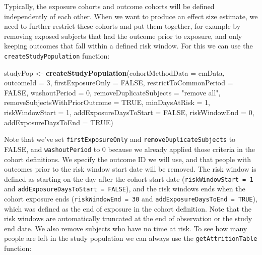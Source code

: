 \documentclass[11pt]{book}
\newenvironment{Shaded}{\begin{snugshade}}{\end{snugshade}}
\newcommand{\KeywordTok}[1]{\textcolor[rgb]{0.13,0.29,0.53}{\textbf{#1}}}
\newcommand{\DataTypeTok}[1]{\textcolor[rgb]{0.13,0.29,0.53}{#1}}
\newcommand{\DecValTok}[1]{\textcolor[rgb]{0.00,0.00,0.81}{#1}}
\newcommand{\StringTok}[1]{\textcolor[rgb]{0.31,0.60,0.02}{#1}}
\newcommand{\OtherTok}[1]{\textcolor[rgb]{0.56,0.35,0.01}{#1}}
\newcommand{\NormalTok}[1]{#1}
\begin{document}
Typically, the exposure cohorts and outcome cohorts will be defined
independently of each other. When we want to produce an effect size
estimate, we need to further restrict these cohorts and put them
together, for example by removing exposed subjects that had the outcome
prior to exposure, and only keeping outcomes that fall within a defined
risk window. For this we can use the \texttt{createStudyPopulation}
function:

\begin{Shaded}
\begin{Highlighting}[]
\NormalTok{studyPop <-}\StringTok{ }\KeywordTok{createStudyPopulation}\NormalTok{(}\DataTypeTok{cohortMethodData =}\NormalTok{ cmData,}
                                  \DataTypeTok{outcomeId =} \DecValTok{3}\NormalTok{,}
                                  \DataTypeTok{firstExposureOnly =} \OtherTok{FALSE}\NormalTok{,}
                                  \DataTypeTok{restrictToCommonPeriod =} \OtherTok{FALSE}\NormalTok{,}
                                  \DataTypeTok{washoutPeriod =} \DecValTok{0}\NormalTok{,}
                                  \DataTypeTok{removeDuplicateSubjects =} \StringTok{"remove all"}\NormalTok{,}
                                  \DataTypeTok{removeSubjectsWithPriorOutcome =} \OtherTok{TRUE}\NormalTok{,}
                                  \DataTypeTok{minDaysAtRisk =} \DecValTok{1}\NormalTok{,}
                                  \DataTypeTok{riskWindowStart =} \DecValTok{1}\NormalTok{,}
                                  \DataTypeTok{addExposureDaysToStart =} \OtherTok{FALSE}\NormalTok{,}
                                  \DataTypeTok{riskWindowEnd =} \DecValTok{0}\NormalTok{,}
                                  \DataTypeTok{addExposureDaysToEnd =} \OtherTok{TRUE}\NormalTok{)}
\end{Highlighting}
\end{Shaded}

Note that we've set \texttt{firstExposureOnly} and
\texttt{removeDuplicateSubjects} to FALSE, and \texttt{washoutPeriod} to
0 because we already applied those criteria in the cohort definitions.
We specify the outcome ID we will use, and that people with outcomes
prior to the risk window start date will be removed. The risk window is
defined as starting on the day after the cohort start date
(\texttt{riskWindowStart\ =\ 1} and
\texttt{addExposureDaysToStart\ =\ FALSE}), and the risk windows ends
when the cohort exposure ends (\texttt{riskWindowEnd\ =\ 30} and
\texttt{addExposureDaysToEnd\ =\ TRUE}), which was defined as the end of
exposure in the cohort definition. Note that the risk windows are
automatically truncated at the end of observation or the study end date.
We also remove subjects who have no time at risk. To see how many people
are left in the study population we can always use the
\texttt{getAttritionTable} function:
\end{document}
